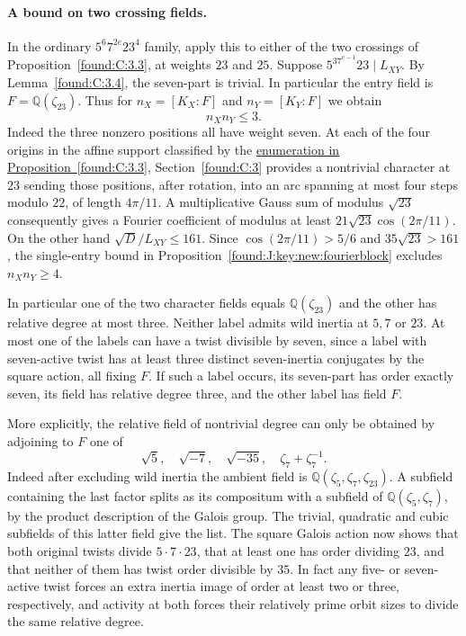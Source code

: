 \documentclass[11pt,a4paper]{article}
\numberwithin{equation}{section}
\theoremstyle{remark}
\begin{document}
\paragraph{A bound on two crossing fields.}
In the ordinary $5^6 7^{2e}23^4$ family, apply this to either of the
two crossings of Proposition~\ref{found:C:3.3}, at weights $23$ and $25$.
Suppose $5^37^{e-1}23\mid L_{XY}$. By Lemma~\ref{found:C:3.4}, the seven-part is trivial. In particular the entry field
is $F=\mathbb Q(\zeta_{23})$. Thus for $n_X=[K_X:F]$ and $n_Y=[K_Y:F]$
we obtain
\[
                          n_Xn_Y\le3.
\]
Indeed the three nonzero positions all have weight seven. At each of
the four origins in the affine support classified by the \href{https://github.com/sebastienpalcoux/WGT-fusion-categories/blob/f7f9f9a02f3116e61eb9dca4eebfed77001494e8/code/word_closure.py}{enumeration in Proposition~\ref*{found:C:3.3}}, Section~\ref{found:C:3} provides a nontrivial character at $23$ sending those positions, after
rotation, into an arc spanning at most four steps modulo $22$, of length $4\pi/11$. A multiplicative
Gauss sum of modulus $\sqrt{23}$ consequently gives a Fourier coefficient
of modulus at least $21\sqrt{23}\cos(2\pi/11)$. On the other hand
$\sqrt D/L_{XY}\le161$. Since $\cos(2\pi/11)>5/6$ and
$35\sqrt{23}>161$, the single-entry bound in
Proposition~\ref{found:J:key:new:fourierblock} excludes $n_Xn_Y\ge4$.

In particular one of the two character fields equals
$\mathbb Q(\zeta_{23})$ and the other has relative degree at most
three. Neither label admits wild inertia at $5,7$ or $23$. At most
one of the labels can have a twist divisible by seven, since a
label with seven-active twist has at least three distinct seven-inertia
conjugates by the square action, all fixing $F$. If such a label occurs,
its seven-part has order exactly seven, its field has relative degree
three, and the other label has field $F$.

More explicitly, the relative field of nontrivial degree can only be
obtained by adjoining to $F$ one of
\[
 \sqrt5,\quad\sqrt{-7},\quad\sqrt{-35},\quad
       \zeta_7+\zeta_7^{-1}.
\]
Indeed after excluding wild inertia the ambient field is
$\mathbb Q(\zeta_{5},\zeta_{7},\zeta_{23})$. A subfield
containing the last factor splits as its compositum with a
subfield of $\mathbb Q(\zeta_5,\zeta_7)$, by the product description
of the Galois group. The trivial, quadratic and cubic subfields
of this latter field give the list. The square Galois action now
shows that both original twists divide $5\cdot7\cdot23$, that at
least one has order dividing $23$, and that neither of them has
twist order divisible by $35$. In fact any five- or seven-active
twist forces an extra inertia image of order at least two or three,
respectively, and activity at both forces their relatively prime
orbit sizes to divide the same relative degree.
\end{document}
